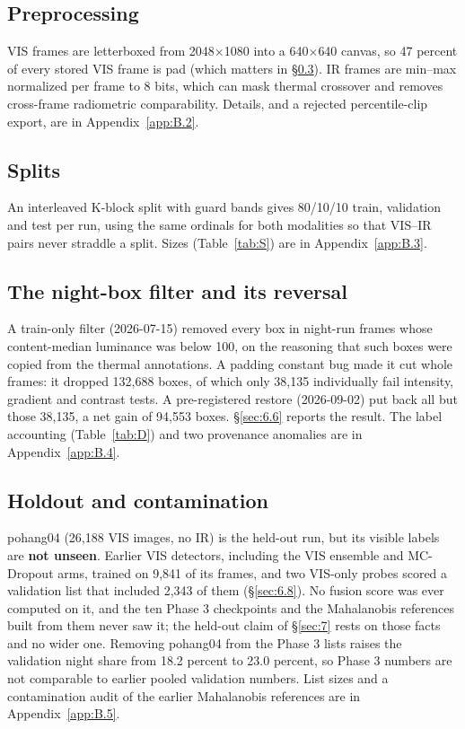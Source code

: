 \documentclass[10pt]{article}
\begin{document}
\subsection{Preprocessing}\label{sec:3.3}
VIS frames are letterboxed from 2048$\times$1080 into a 640$\times$640 canvas, so 47 percent of every stored VIS frame is pad (which matters in \S\ref{sec:3.5}). IR frames are min--max normalized per frame to 8 bits, which can mask thermal crossover and removes cross-frame radiometric comparability. Details, and a rejected percentile-clip export, are in Appendix~\ref{app:B.2}.

\subsection{Splits}\label{sec:3.4}
An interleaved K-block split with guard bands gives 80/10/10 train, validation and test per run, using the same ordinals for both modalities so that VIS--IR pairs never straddle a split. Sizes (Table~\ref{tab:S}) are in Appendix~\ref{app:B.3}.

\subsection{The night-box filter and its reversal}\label{sec:3.5}
A train-only filter (2026-07-15) removed every box in night-run frames whose content-median luminance was below 100, on the reasoning that such boxes were copied from the thermal annotations. A padding constant bug made it cut whole frames: it dropped 132,688 boxes, of which only 38,135 individually fail intensity, gradient and contrast tests. A pre-registered restore (2026-09-02) put back all but those 38,135, a net gain of 94,553 boxes. \S\ref{sec:6.6} reports the result. The label accounting (Table~\ref{tab:D}) and two provenance anomalies are in Appendix~\ref{app:B.4}.

\subsection{Holdout and contamination}\label{sec:3.6}
pohang04 (26,188 VIS images, no IR) is the held-out run, but its visible labels are \textbf{not unseen}. Earlier VIS detectors, including the VIS ensemble and MC-Dropout arms, trained on 9,841 of its frames, and two VIS-only probes scored a validation list that included 2,343 of them (\S\ref{sec:6.8}). No fusion score was ever computed on it, and the ten Phase 3 checkpoints and the Mahalanobis references built from them never saw it; the held-out claim of \S\ref{sec:7} rests on those facts and no wider one. Removing pohang04 from the Phase 3 lists raises the validation night share from 18.2 percent to 23.0 percent, so Phase 3 numbers are not comparable to earlier pooled validation numbers. List sizes and a contamination audit of the earlier Mahalanobis references are in Appendix~\ref{app:B.5}.
\end{document}
